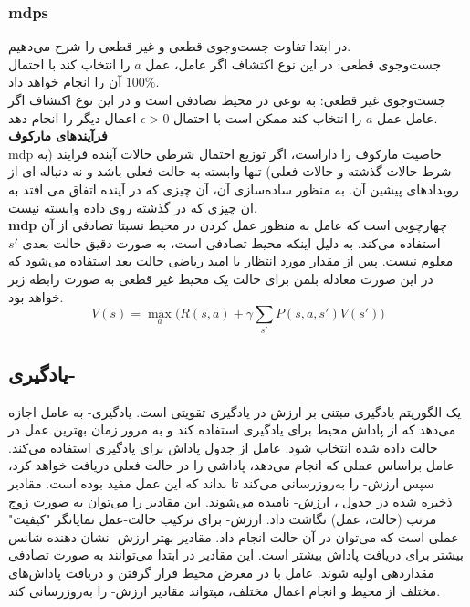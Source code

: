 \subsubsection{\glspl{mdp}}
در ابتدا تفاوت جست‌وجوی قطعی و غیر قطعی را شرح می‌دهیم.\\
 جست‌وجوی قطعی: در این نوع اکتشاف اگر عامل، عمل $a$ را انتخاب کند با احتمال $100\%$  آن را انجام خواهد داد.\\
 جست‌وجوی غیر قطعی: به نوعی در محیط تصادفی است و در این نوع اکتشاف اگر عامل عمل $a$ را انتخاب کند ممکن است با احتمال $\epsilon>0$ اعمال دیگر را انجام دهد. 
 \\
\textbf{فرآیندهای مارکوف}
\\
 \gls{mdp} خاصیت مارکوف را داراست، اگر توزیع احتمال شرطی حالات آینده فرایند (به شرط حالات گذشته و حالات فعلی) تنها وابسته به حالت فعلی باشد و نه دنباله ای از رویدادهای پیشین آن. به منظور ساده‌سازی آن، آن چیزی که در آینده اتفاق می افتد به ان چیزی که در گذشته روی داده وابسته نیست. 
\\
\textbf{\gls{mdp}}
چهارچوبی است که عامل به منظور عمل کردن در محیط نسبتا تصادفی از آن استفاده می‌کند. به دلیل اینکه محیط تصادفی است، به صورت دقیق حالت بعدی $s'$ معلوم نیست. پس از مقدار مورد انتظار یا امید ریاضی حالت بعد استفاده می‌شود که در این صورت معادله بلمن برای حالت یک محیط غیر قطعی به صورت رابطه زیر خواهد بود.
  \begin{equation}
 	V(s) = \max_{a}\big(R(s,a)+\gamma \sum_{s'}P(s,a,s')V(s')\big)
 	\label{eq:ch_lr:bellman}
 \end{equation}


\subsection{یادگیری-}
یک الگوریتم یادگیری مبتنی بر ارزش در یادگیری تقویتی است. یادگیری- به عامل اجازه می‌دهد که از پاداش محیط برای یادگیری استفاده کند و به مرور زمان بهترین عمل در حالت داده شده انتخاب شود. عامل از جدول پاداش برای یادگیری استفاده می‌کند. عامل براساس عملی که انجام می‌دهد، پاداشی را در حالت فعلی دریافت خواهد کرد، سپس ارزش- را به‌روزرسانی می‌کند تا بداند که این عمل مفید بوده است.
مقادیر ذخیره شده در جدول ،  ارزش- نامیده می‌شوند. این مقادیر را می‌توان به صورت زوج مرتب  
(حالت، عمل)
نگاشت داد. ارزش- برای ترکیب حالت-عمل نمایانگر "کیفیت" عملی است که می‌توان در آن حالت انجام داد. مقادیر بهتر ارزش- نشان دهنده شانس بیشتر برای دریافت پاداش بیشتر است. این مقادیر  در ابتدا می‌توانند به صورت تصادفی مقداردهی اولیه شوند. عامل با در معرض محیط قرار گرفتن و دریافت پاداش‌های مختلف از محیط و انجام  اعمال مختلف، میتواند مقادیر  ارزش- را به‌روزرسانی کند.

